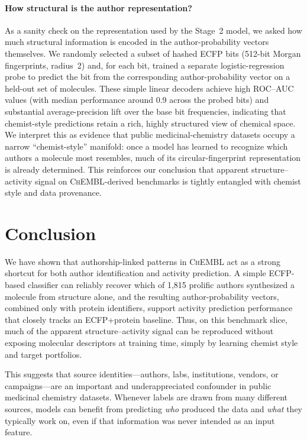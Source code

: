 \documentclass[11pt]{article}
\begin{document}
\paragraph{How structural is the author representation?}
As a sanity check on the representation used by the Stage~2 model, we asked how much structural information is encoded in the author-probability vectors themselves. We randomly selected a subset of hashed ECFP bits (512-bit Morgan fingerprints, radius~2) and, for each bit, trained a separate logistic-regression probe to predict the bit from the corresponding author-probability vector on a held-out set of molecules. These simple linear decoders achieve high ROC--AUC values (with median performance around 0.9 across the probed bits) and substantial average-precision lift over the base bit frequencies, indicating that chemist-style predictions retain a rich, highly structured view of chemical space. We interpret this as evidence that public medicinal-chemistry datasets occupy a narrow ``chemist-style'' manifold: once a model has learned to recognize which authors a molecule most resembles, much of its circular-fingerprint representation is already determined. This reinforces our conclusion that apparent structure--activity signal on \textsc{ChEMBL}-derived benchmarks is tightly entangled with chemist style and data provenance.

\section{Conclusion}

We have shown that authorship-linked patterns in \textsc{ChEMBL} act as a strong shortcut for both author identification and activity prediction. A simple ECFP-based classifier can reliably recover which of 1{,}815 prolific authors synthesized a molecule from structure alone, and the resulting author-probability vectors, combined only with protein identifiers, support activity prediction performance that closely tracks an ECFP+protein baseline. Thus, on this benchmark slice, much of the apparent structure--activity signal can be reproduced without exposing molecular descriptors at training time, simply by learning chemist style and target portfolios.

This suggests that source identities---authors, labs, institutions, vendors, or campaigns---are an important and underappreciated confounder in public medicinal chemistry datasets. Whenever labels are drawn from many different sources, models can benefit from predicting \emph{who} produced the data and \emph{what} they typically work on, even if that information was never intended as an input feature.
\end{document}
